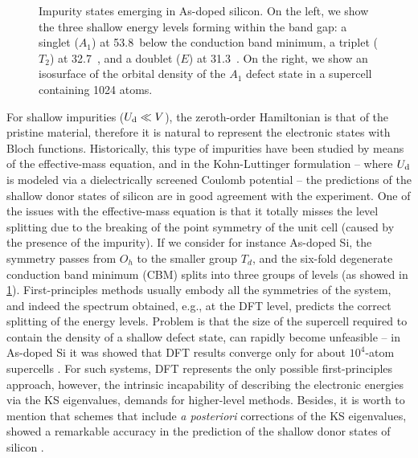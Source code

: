\begin{figure}
    \centering
    \caption[]{Impurity states emerging in As-doped silicon. On the left, we show the three shallow energy levels forming within the band gap: a singlet ($A_1$) at 53.8~\mev below the conduction band minimum, a triplet ($T_2$) at 32.7~\mev, and a doublet ($E$) at 31.3~\mev. On the right, we show an isosurface of the orbital density of the $A_1$ defect state in a supercell containing 1024 atoms.}
    \label{fig:as-si-defect}
\end{figure}

For shallow impurities ($U_{\rm d} \ll V$), the zeroth-order Hamiltonian is that of the pristine material, therefore it is natural to represent the electronic states with Bloch functions. Historically, this type of impurities have been studied by means of the effective-mass equation, and in the Kohn-Luttinger formulation \cite{kohn_theory_1955} -- where $U_{\rm d}$ is modeled via a dielectrically screened Coulomb potential -- the predictions of the shallow donor states of silicon are in good agreement with the experiment. One of the issues with the effective-mass equation is that it totally misses the level splitting due to the breaking of the point symmetry of the unit cell (caused by the presence of the impurity). If we consider for instance As-doped Si, the symmetry passes from $O_h$ to the smaller group $T_d$, and the six-fold degenerate conduction band minimum (CBM) splits into three groups of levels (as showed in \cref{fig:as-si-defect}). First-principles methods usually embody all the symmetries of the system, and indeed the spectrum obtained, e.g., at the DFT level, predicts the correct splitting of the energy levels. Problem is that the size of the supercell required to contain the density of a shallow defect state, can rapidly become unfeasible -- in As-doped Si it was showed that DFT results converge only for about $10^4$-atom supercells \cite{yamamoto_first-principles_2009}. For such systems, DFT represents the only possible first-principles approach, however, the intrinsic incapability of describing the electronic energies via the KS eigenvalues, demands for higher-level methods. Besides, it is worth to mention that schemes that include \emph{a posteriori} corrections of the KS eigenvalues, showed a remarkable accuracy in the prediction of the shallow donor states of silicon \cite{yamamoto_first-principles_2009,smith_ab_2017}.

